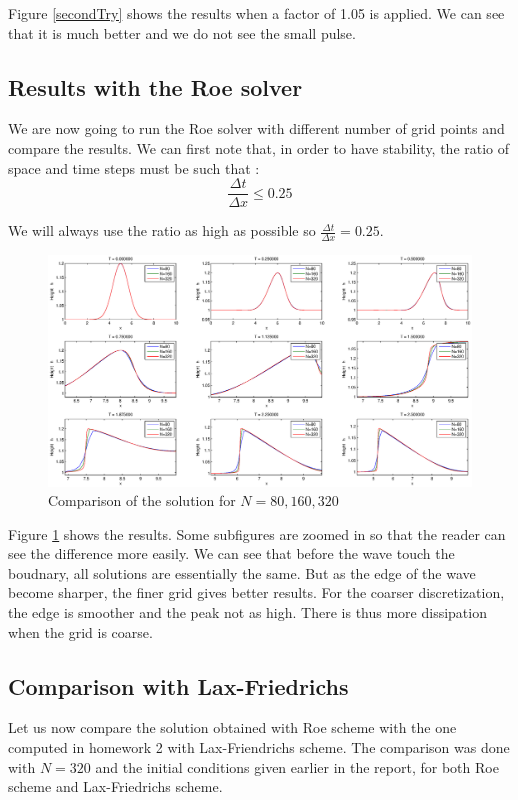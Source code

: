 Figure \ref{secondTry} shows the results when a factor of 1.05 is applied. We can see that it is much better and we do not see the small pulse.

\subsection{Results with the Roe solver}
We are now going to run the Roe solver with different number of grid points and compare the results. We can first note that, in order to have stability, the ratio of space and time steps must be such that : 
$$\frac{\Delta t}{\Delta x} \leq 0.25$$

We will always use the ratio as high as possible so $\frac{\Delta t}{\Delta x}=0.25$. 
\begin{figure}
\begin{center}
\includegraphics[scale=0.35]{comp.eps}
\caption{Comparison of the solution for $N=80,160,320$}
\label{comp}
\end{center}
\end{figure}

Figure \ref{comp} shows the results. Some subfigures are zoomed in so that the reader can see the difference more easily. We can see that before the wave touch the boudnary, all solutions are essentially the same. But as the edge of the wave become sharper, the finer grid gives better results. For the coarser discretization, the edge is smoother and the peak not as high. There is thus more dissipation when the grid is coarse.

\subsection{Comparison with Lax-Friedrichs}
Let us now compare the solution obtained with Roe scheme with the one computed in homework 2 with Lax-Friendrichs scheme. The comparison was done with $N=320$ and the initial conditions given earlier in the report, for both Roe scheme and Lax-Friedrichs scheme.

